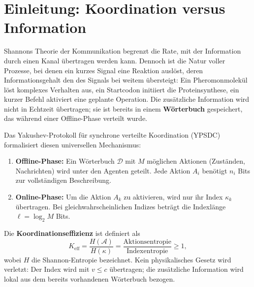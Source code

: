 \documentclass[12pt,a4paper]{article}
\begin{document}
	\section{Einleitung: Koordination versus Information}
	\label{sec:intro}
	
	Shannons Theorie der Kommunikation begrenzt die Rate, mit der Information durch einen Kanal übertragen werden kann.  Dennoch ist die Natur voller Prozesse, bei denen ein kurzes Signal eine Reaktion auslöst, deren Informationsgehalt den des Signals bei weitem übersteigt: Ein Pheromonmolekül löst komplexes Verhalten aus, ein Startcodon initiiert die Proteinsynthese, ein kurzer Befehl aktiviert eine geplante Operation.  Die zusätzliche Information wird nicht in Echtzeit übertragen; sie ist bereits in einem \textbf{Wörterbuch} gespeichert, das während einer Offline-Phase verteilt wurde.
	
	Das Yakushev-Protokoll für synchrone verteilte Koordination (YPSDC) formalisiert diesen universellen Mechanismus:
	\begin{enumerate}[label=(\roman*)]
		\item \textbf{Offline-Phase:} Ein Wörterbuch \(\mathcal{D}\) mit \(M\) möglichen Aktionen (Zuständen, Nachrichten) wird unter den Agenten geteilt.  Jede Aktion \(A_i\) benötigt \(n_i\) Bits zur vollständigen Beschreibung.
		\item \textbf{Online-Phase:} Um die Aktion \(A_k\) zu aktivieren, wird nur ihr Index \(\kappa_k\) übertragen.  Bei gleichwahrscheinlichen Indizes beträgt die Indexlänge \(\ell = \log_2 M\) Bits.
	\end{enumerate}
	Die \textbf{Koordinationseffizienz} ist definiert als
	\begin{equation}
		\boxed{K_{\mathrm{eff}} = \frac{H(\mathcal{A})}{H(\kappa)} = \frac{\text{Aktionsentropie}}{\text{Indexentropie}} \ge 1},
		\label{eq:keff-def}
	\end{equation}
	wobei \(H\) die Shannon-Entropie bezeichnet.  Kein physikalisches Gesetz wird verletzt: Der Index wird mit \(v \le c\) übertragen; die zusätzliche Information wird lokal aus dem bereits vorhandenen Wörterbuch bezogen.
	
	\begin{center}
	\end{center}
	
\end{document}
